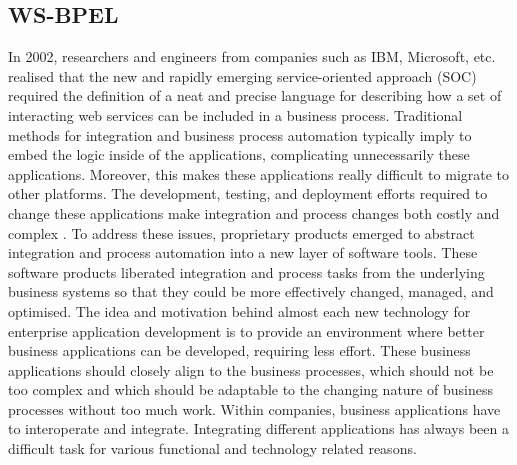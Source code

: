 \subsection {WS-BPEL}
In 2002, researchers and engineers from companies such as IBM, Microsoft, etc.
realised that the new and rapidly emerging service-oriented approach (SOC) required the definition of 
a neat and precise language for describing how a set of interacting web services can be included
in a business process. Traditional methods for integration and business process automation 
typically imply to embed the logic inside of the applications, complicating unnecessarily these applications. 
Moreover, this makes these applications really difficult to migrate to other platforms. 
The development, testing, and deployment efforts required 
to change these applications make integration and process changes both costly and complex \cite{bpelsoftcare}.
To address these issues, proprietary products emerged 
to abstract integration and process automation into a new layer of software tools. 
These software products liberated integration and process tasks from 
the underlying business systems so that they could be more effectively changed, managed, and optimised.
The idea and motivation behind almost each new technology for
enterprise application development is to provide an environment where better
business applications can be developed, requiring less effort. These business applications
should closely align to the business processes, which should not be too complex and
which should be adaptable to the changing nature of business processes without too much
work. Within companies, business applications have to
interoperate and integrate. Integrating different
applications has always been a difficult task for various functional and technology
related reasons.

